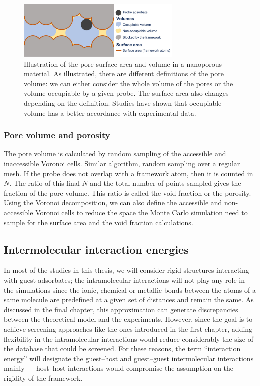 \documentclass[main.tex]{subfiles}
\begin{document}
\begin{figure}[h!]
  \centering
  \includegraphics[width=0.7\textwidth]{figures/1-screening/Pore_descriptors.jpg}
  \caption{Illustration of the pore surface area and volume in a nanoporous material. As illustrated, there are different definitions of the pore volume: we can either consider the whole volume of the pores or the volume occupiable by a given probe. The surface area also changes depending on the definition. Studies have shown that occupiable volume has a better accordance with experimental data.\autocite{vol_Ongari2017}}\label{fgr:pores}
\end{figure}

\subsubsection{Pore volume and porosity}

The pore volume is calculated by random sampling of the accessible and inaccessible Voronoi cells. Similar algorithm, random sampling over a regular mesh. If the probe does not overlap with a framework atom, then it is counted in $N$. The ratio of this final $N$ and the total number of points sampled gives the fraction of the pore volume. This ratio is called the void fraction or the porosity. Using the Voronoi decomposition, we can also define the accessible and non-accessible Voronoi cells to reduce the space the Monte Carlo simulation need to sample for the surface area and the void fraction calculations.


\subsection{Intermolecular interaction energies}\label{sct:interaction}

In most of the studies in this thesis, we will consider rigid structures interacting with guest adsorbates; the intramolecular interactions will not play any role in the simulations since the ionic, chemical or metallic  bonds between the atoms of a same molecule are predefined at a given set of distances and remain the same. As discussed in the final chapter, this approximation can generate discrepancies between the theoretical model and the experiments. However, since the goal is to achieve screening approaches like the ones introduced in the first chapter, adding flexibility in the intramolecular interactions would reduce considerably the size of the database that could be screened. For these reasons, the term ``interaction energy'' will designate the guest--host and guest--guest intermolecular interactions mainly --- host--host interactions would compromise the assumption on the rigidity of the framework.
\end{document}
